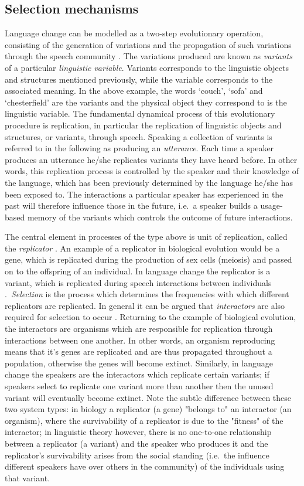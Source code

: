 \documentclass[12pt]{article}
\begin{document}
\subsection{Selection mechanisms}
Language change can be modelled as a two-step evolutionary operation, consisting of the generation of variations and the propagation of such variations through the speech community \cite{croft}. The variations produced are known as \emph{variants} of a particular \emph{linguistic variable}. Variants corresponds to the linguistic objects and structures mentioned previously, while the variable corresponds to the associated meaning. In the above example, the words `couch', `sofa' and `chesterfield' are the variants and the physical object they correspond to is the linguistic variable. The fundamental dynamical process of this evolutionary procedure is replication, in particular the replication of linguistic objects and structures, or variants, through speech. Speaking a collection of variants is referred to in the following as producing an \emph{utterance}. Each time a speaker produces an utterance he/she replicates variants they have heard before. In other words, this replication process is controlled by the speaker and their knowledge of the language, which has been previously determined by the language he/she has been exposed to. The interactions a particular speaker has experienced in the past will therefore influence those in the future, i.e.\ a speaker builds a usage-based memory of the variants which controls the outcome of future interactions. 

The central element in processes of the type above is unit of replication, called the \emph{replicator} \cite{hull}. An example of a replicator in biological evolution would be a gene, which is replicated during the production of sex cells (meiosis) and passed on to the offspring of an individual. In language change the replicator is a variant, which is replicated during speech interactions between individuals \cite{lc&v}.\ \emph{Selection} is the process which determines the frequencies with which different replicators are replicated. In general it can be argued that \emph{interactors} are also required for selection to occur \cite{hull}. Returning to the example of biological evolution, the interactors are organisms which are responsible for replication through interactions between one another. In other words, an organism reproducing means that it's genes are replicated and are thus propagated throughout a population, otherwise the genes will become extinct. Similarly, in language change the speakers are the interactors which replicate certain variants; if speakers select to replicate one variant more than another then the unused variant will eventually become extinct. Note the subtle difference between these two system types: in biology a replicator (a gene) "belongs to" an interactor (an organism), where the survivability of a replicator is due to the "fitness" of the interactor; in linguistic theory however, there is no one-to-one relationship between a replicator (a variant) and the speaker who produces it and the replicator's survivability arises from the social standing (i.e.\ the influence different speakers have over others in the community) of the individuals using that variant.
\end{document}
